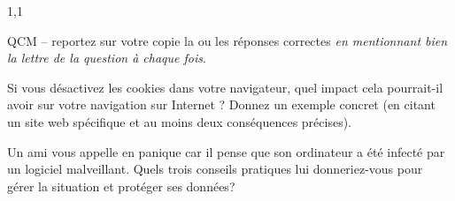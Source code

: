 \documentclass[11pt,a4paper]{exam}
\begin{document}
    \begin{spacing}{1,1}
        \begin{questions} %
        	
        	\question QCM -- reportez sur votre copie la ou les réponses correctes \textit{en mentionnant bien la lettre de la question à chaque fois}.
			        	
        	\question[2] Si vous désactivez les cookies dans votre navigateur, quel impact cela pourrait-il avoir sur votre navigation sur Internet ? Donnez un exemple concret (en citant un site web spécifique et au moins deux conséquences précises).
        	
        	\question[2] Un ami vous appelle en panique car il pense que son ordinateur a été infecté par un logiciel malveillant. Quels trois conseils pratiques lui donneriez-vous pour gérer la situation et protéger ses données?
        	

\end{questions}
\end{spacing}
\end{document}
